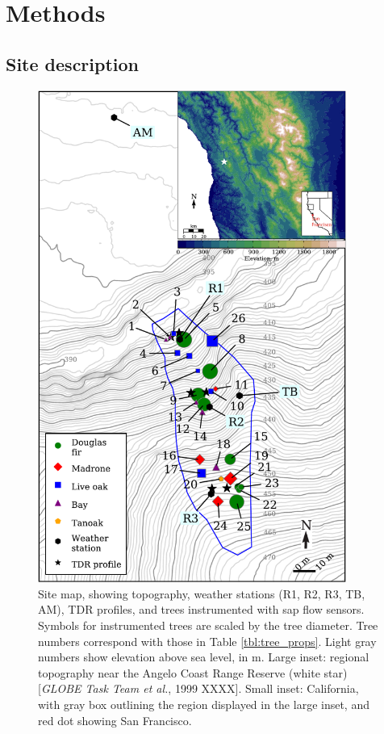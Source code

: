 \section{Methods}
\subsection{Site description}
\label{sec:sapflow_sitedesc}

\begin{figure}[here]
\includegraphics[width=0.9\textwidth]{ch1-sapflow/figures/Figure01.pdf}
\caption{Site map, showing topography, weather stations (R1, R2, R3, TB, AM), TDR profiles, and trees instrumented with sap flow sensors.  Symbols for instrumented trees are scaled by the tree diameter.  Tree numbers correspond with those in Table \ref{tbl:tree_props}.  Light gray numbers show elevation above sea level, in m.  Large inset: regional topography near the Angelo Coast Range Reserve (white star) [\textit{GLOBE Task Team et al.}, 1999 XXXX].  Small inset: California, with gray box outlining the region displayed in the large inset, and red dot showing San Francisco.}
\label{fig:sapflow_map}
\end{figure}

